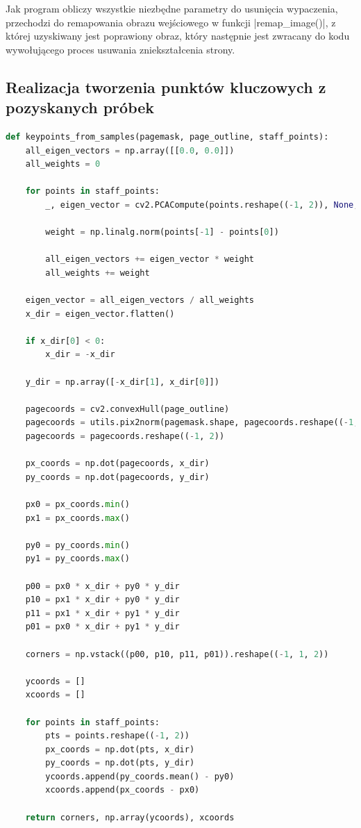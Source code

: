 Jak program obliczy wszystkie niezbędne parametry do usunięcia wypaczenia, przechodzi do remapowania obrazu wejściowego w funkcji \pyth|remap_image()|, z której uzyskiwany jest poprawiony obraz, który następnie jest zwracany do kodu wywołującego proces usuwania zniekształcenia strony.

\subsection{Realizacja tworzenia punktów kluczowych z pozyskanych próbek}

\begin{lstlisting}[caption={\pyth|keypoints_from_samples()| - funkcja tworząca tablice punktów kluczowych z pozyskanych próbek.}, label={keypoints-from-samples}, language=Python]
def keypoints_from_samples(pagemask, page_outline, staff_points):
	all_eigen_vectors = np.array([[0.0, 0.0]])
	all_weights = 0
	
	for points in staff_points:
		_, eigen_vector = cv2.PCACompute(points.reshape((-1, 2)), None, maxComponents=1)
		
		weight = np.linalg.norm(points[-1] - points[0])
		
		all_eigen_vectors += eigen_vector * weight
		all_weights += weight
	
	eigen_vector = all_eigen_vectors / all_weights
	x_dir = eigen_vector.flatten()
	
	if x_dir[0] < 0:
		x_dir = -x_dir
	
	y_dir = np.array([-x_dir[1], x_dir[0]])
	
	pagecoords = cv2.convexHull(page_outline)
	pagecoords = utils.pix2norm(pagemask.shape, pagecoords.reshape((-1, 1, 2)))
	pagecoords = pagecoords.reshape((-1, 2))
	
	px_coords = np.dot(pagecoords, x_dir)
	py_coords = np.dot(pagecoords, y_dir)
	
	px0 = px_coords.min()
	px1 = px_coords.max()
	
	py0 = py_coords.min()
	py1 = py_coords.max()
	
	p00 = px0 * x_dir + py0 * y_dir
	p10 = px1 * x_dir + py0 * y_dir
	p11 = px1 * x_dir + py1 * y_dir
	p01 = px0 * x_dir + py1 * y_dir
	
	corners = np.vstack((p00, p10, p11, p01)).reshape((-1, 1, 2))
	
	ycoords = []
	xcoords = []
	
	for points in staff_points:
		pts = points.reshape((-1, 2))
		px_coords = np.dot(pts, x_dir)
		py_coords = np.dot(pts, y_dir)
		ycoords.append(py_coords.mean() - py0)
		xcoords.append(px_coords - px0)
	
	return corners, np.array(ycoords), xcoords
\end{lstlisting}

